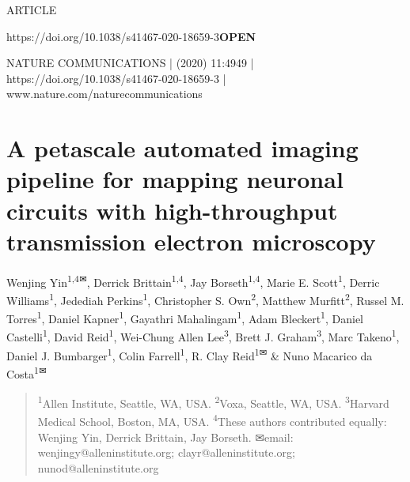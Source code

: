 \documentclass{article}
\begin{document}

\noindent ARTICLE\par
\noindent https://doi.org/10.1038/s41467-020-18659-3\quad \textbf{OPEN}\par
\noindent NATURE COMMUNICATIONS | (2020) 11:4949 | https://doi.org/10.1038/s41467-020-18659-3 | www.nature.com/naturecommunications\par

\section*{A petascale automated imaging pipeline for mapping neuronal circuits with high-throughput transmission electron microscopy}

\noindent Wenjing Yin\textsuperscript{1,4\textsf{✉}}, Derrick Brittain\textsuperscript{1,4}, Jay Borseth\textsuperscript{1,4}, Marie E. Scott\textsuperscript{1}, Derric Williams\textsuperscript{1}, Jedediah Perkins\textsuperscript{1}, Christopher S. Own\textsuperscript{2}, Matthew Murfitt\textsuperscript{2}, Russel M. Torres\textsuperscript{1}, Daniel Kapner\textsuperscript{1}, Gayathri Mahalingam\textsuperscript{1}, Adam Bleckert\textsuperscript{1}, Daniel Castelli\textsuperscript{1}, David Reid\textsuperscript{1}, Wei-Chung Allen Lee\textsuperscript{3}, Brett J. Graham\textsuperscript{3}, Marc Takeno\textsuperscript{1}, Daniel J. Bumbarger\textsuperscript{1}, Colin Farrell\textsuperscript{1}, R. Clay Reid\textsuperscript{1\textsf{✉}} \& Nuno Macarico da Costa\textsuperscript{1\textsf{✉}}

\begin{quote}\small
\noindent \textsuperscript{1}Allen Institute, Seattle, WA, USA. \textsuperscript{2}Voxa, Seattle, WA, USA. \textsuperscript{3}Harvard Medical School, Boston, MA, USA. \textsuperscript{4}These authors contributed equally: Wenjing Yin, Derrick Brittain, Jay Borseth. \textsf{✉}email: wenjingy@alleninstitute.org; clayr@alleninstitute.org; nunod@alleninstitute.org
\end{quote}
\end{document}
